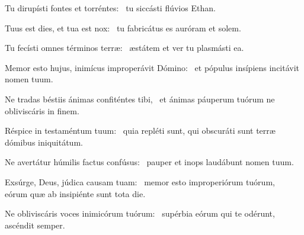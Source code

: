 \item Tu dirupísti fontes et torréntes:~\psstar{} tu siccásti flúvios Ethan.

\item Tuus est dies, et tua est nox:~\psstar{} tu fabricátus es auróram et solem.

\item Tu fecísti omnes términos terræ:~\psstar{} æstátem et ver tu plasmásti ea.

\item Memor esto hujus, inimícus improperávit Dómino:~\psstar{} et pópulus insípiens incitávit nomen tuum.

\item Ne tradas béstiis ánimas confiténtes tibi,~\psstar{} et ánimas páuperum tuórum ne obliviscáris in finem.

\item Réspice in testaméntum tuum:~\psstar{} quia repléti sunt, qui obscuráti sunt terræ dómibus iniquitátum.

\item Ne avertátur húmilis factus confúsus:~\psstar{} pauper et inops laudábunt nomen tuum.

\item Exsúrge, Deus, júdica causam tuam:~\pscross{} memor esto improperiórum tuórum,~\psstar{} eórum quæ ab insipiénte sunt tota die.

\item Ne obliviscáris voces inimicórum tuórum:~\psstar{} supérbia eórum qui te odérunt, ascéndit semper.

